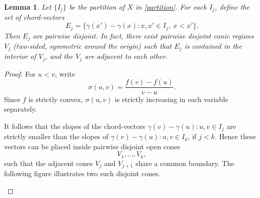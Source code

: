 \documentclass{amsart}
\numberwithin{equation}{section}
\newtheorem{lemma}[theorem]{Lemma}
\begin{document}
\begin{lemma}
    \label{cone-for-difference}
    Let $\{I_j\}$ be the partition of $X$ in \eqref{partition}.
    For each $I_j$, define the set of chord-vectors
    \begin{equation}
        \nonumber
        E_j=\{\gamma(x')-\gamma(x):x,x'\in I_j,\ x<x'\}.
    \end{equation}
    Then $E_j$ are pairwise disjoint.
    In fact, there exist pairwise disjoint conic regions $V_j$ (two-sided, symmetric around the origin) such that $E_j$ is contained in the interior of $V_j$, and the $V_j$ are adjacent to each other.
\end{lemma}
\begin{proof}
    For $u<v$, write
    \begin{equation}
        \nonumber
        \sigma(u,v)=\frac{f(v)-f(u)}{v-u}.
    \end{equation}
    Since $f$ is strictly convex, $\sigma(u,v)$ is strictly increasing in each variable separately. 
    
    It follows that the slopes of the chord-vectors $\gamma(v)-\gamma(u): u,v\in I_j$  are strictly smaller than the slopes of  $\gamma(v)-\gamma(u): u,v\in I_k$, if $j<k$. 
    Hence these vectors can be placed inside pairwise disjoint open cones
    \begin{equation}
    \nonumber
        V_1,\ldots, V_h,
    \end{equation} 
    such that the adjacent cones $V_j$ and $V_{j+1}$ share a common boundary.
    The following figure illustrates two such disjoint cones.   \qedhere
    
    \begin{figure}[htbp]
        \centering
\end{figure}
\end{proof}
\end{document}
